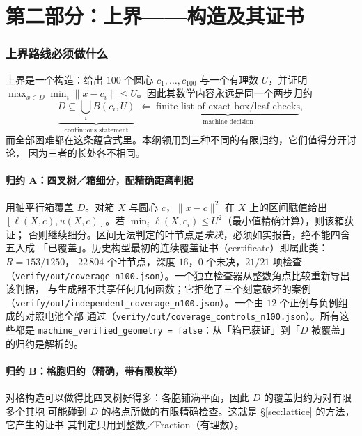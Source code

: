 \part*{第二部分：上界——构造及其证书}
\setcounter{section}{0}

\section{上界路线必须做什么}

上界是一个构造：给出 $100$ 个圆心 $c_1,\dots,c_{100}$ 与一个有理数 $U$，并证明
$\max_{x\in D}\min_i\|x-c_i\|\le U$。因此其数学内容永远是同一个两步归约
\[
\underbrace{D\subseteq\bigcup_i B(c_i,U)}_{\text{continuous statement}}
\;\Longleftarrow\;
\underbrace{\text{finite list of exact box/leaf checks}}_{\text{machine decision}} ,
\]
而全部困难都在这条蕴含式里。本纲领用到三种不同的有限归约，它们值得分开讨论，
因为三者的长处各不相同。

\subsection{归约 A：四叉树／箱细分，配精确距离判据}

用轴平行箱覆盖 $D$。对箱 $X$ 与圆心 $c$，$\|x-c\|^2$ 在 $X$ 上的区间赋值给出
$[\ell(X,c),u(X,c)]$。若 $\min_i \ell(X,c_i)\le U^2$（最小值精确计算），则该箱获证；
否则继续细分。区间无法判定的叶节点是\emph{未决}，必须如实报告，绝不能四舍五入成
「已覆盖」。历史构型最初的连续覆盖证书（certificate）即属此类：$R=153/1250$，
$22\,804$ 个叶节点，深度 $16$，$0$ 个未决，$21/21$ 项检查
（\texttt{verify/\allowbreak{}out/\allowbreak{}coverage\_\allowbreak{}n100.json}）。一个独立检查器从整数角点比较重新导出该判据，
与生成器不共享任何几何函数；它拒绝了三个刻意破坏的案例
（\texttt{verify/\allowbreak{}out/\allowbreak{}independent\_\allowbreak{}coverage\_\allowbreak{}n100.json}）。一个由 $12$ 个正例与负例组成的对照电池全部
通过（\texttt{verify/\allowbreak{}out/\allowbreak{}coverage\_\allowbreak{}controls\_\allowbreak{}n100.json}）。所有这些都是
\texttt{machine\_\allowbreak{}verified\_\allowbreak{}geometry = false}：从「箱已获证」到「$D$ 被覆盖」的归约是解析的。

\subsection{归约 B：格胞归约（精确，带有限枚举）}

对格构造可以做得比四叉树好得多：各胞铺满平面，因此 $D$ 的覆盖归约为对有限多个其胞
可能碰到 $D$ 的格点所做的有限精确检查。这就是 \S\ref{sec:lattice} 的方法，它产生的证书
其判定只用到整数／Fraction（有理数）。

